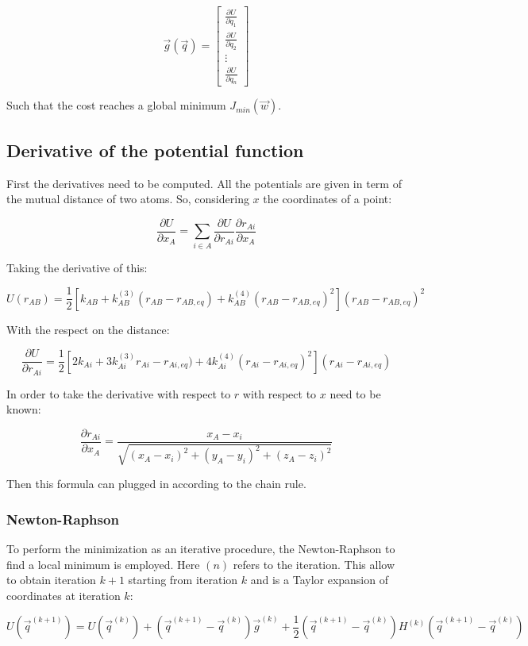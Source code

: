 	$$\vec{g}(\vec{q}) = \begin{bmatrix} \frac{\partial U}{\partial q_1} \\ \frac{\partial U}{\partial q_2} \\ \vdots \\ \frac{\partial U}{\partial q_n}\end{bmatrix}$$

	Such that the cost reaches a global minimum $J_{min}(\vec{w})$.

	\subsection{Derivative of the potential function}
	First the derivatives need to be computed.
	All the potentials are given in term of the mutual distance of two atoms.
	So, considering $x$ the coordinates of a point:

	$$\frac{\partial U}{\partial x_A} = \sum\limits_{i\in A}\frac{\partial U}{\partial r_{Ai}}\frac{\partial r_{Ai}}{\partial x_A}$$

	Taking the derivative of this:

	$$U(r_{AB}) = \frac{1}{2}[k_{AB}+k_{AB}^{(3)}(r_{AB}-r_{AB, eq}) + k_{AB}^{(4)}(r_{AB}-r_{AB, eq})^2](r_{AB}-r_{AB,eq})^2$$

	With the respect on the distance:

	$$\frac{\partial U}{\partial r_{Ai}} = \frac{1}{2}[2k_{Ai}+3k_{Ai}^{(3)}r_{Ai}-r_{Ai, eq}) + 4k^{(4)}_{Ai}(r_{Ai}-r_{Ai, eq})^2](r_{Ai}-r_{Ai, eq})$$

	In order to take the derivative with respect to $r$ with respect to $x$ need to be known:

	$$\frac{\partial r_{Ai}}{\partial x_A} = \frac{x_A-x_i}{\sqrt{(x_A-x_i)^2+(y_A-y_i)^2+(z_A-z_i)^2}}$$

	Then this formula can plugged in according to the chain rule.

		\subsubsection{Newton-Raphson}
		To perform the minimization as an iterative procedure, the Newton-Raphson to find a local minimum is employed.
		Here $(n)$ refers to the iteration.
		This allow to obtain iteration $k+1$ starting from iteration $k$ and is a Taylor expansion of coordinates at iteration $k$:

		$$U(\vec{q}^{(k+1)}) = U(\vec{q}^{(k)}) + (\vec{q}^{(k+1)} -\vec{q}^{(k)})\vec{g}^{(k)} + \frac{1}{2}(\vec{q}^{(k+1)}-\vec{q}^{(k)})H^{(k)}(\vec{q}^{(k+1)}-\vec{q}^{(k)})$$

